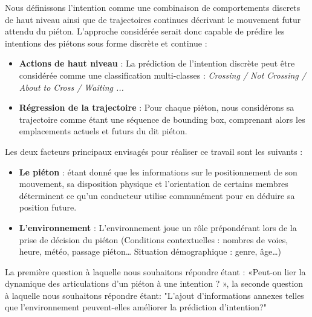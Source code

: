 Nous définissons l'intention comme une combinaison de comportements discrets de haut niveau ainsi que de trajectoires continues décrivant le mouvement futur attendu du piéton. L’approche considérée serait donc capable de prédire les intentions des piétons sous forme discrète et continue : 

\begin{itemize}
    \item \textbf{Actions de haut niveau} : La prédiction de l'intention discrète peut être considérée comme une classification multi-classes : \textit{Crossing / Not Crossing / About to Cross / Waiting ...}
    \item \textbf{Régression de la trajectoire} : Pour chaque piéton, nous considérons sa trajectoire comme étant une séquence de bounding box, comprenant alors les emplacements actuels et futurs du dit piéton.
\end{itemize}

Les deux facteurs principaux envisagés pour réaliser ce travail sont les suivants :

\begin{itemize}
    \item  \textbf{Le piéton} : étant donné que les informations sur le positionnement de son mouvement, sa disposition physique et l'orientation de certains membres déterminent ce qu'un conducteur utilise communément pour en déduire sa position future.
    \item \textbf{L’environnement} : L’environnement joue un rôle prépondérant lors de la prise de décision du piéton (Conditions contextuelles : nombres de voies, heure, météo, passage piéton… Situation démographique : genre, âge…)
\end{itemize}

La première question à laquelle nous souhaitons répondre étant : «Peut-on lier la dynamique des articulations d'un piéton à une intention ? », la seconde question à laquelle nous souhaitons répondre étant: "L'ajout d'informations annexes telles que l'environnement peuvent-elles améliorer la prédiction d'intention?"













